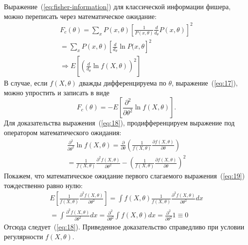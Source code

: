 Выражение~(\ref{eq:fisher-information}) для классической информации фишера, можно переписать через математическое ожидание: 
\begin{multline}
    \label{eq:17}
        F_c(\theta) =
            \sum_x P(x, \theta)\left[\frac{1}{P(x,\theta)}\frac{d}{d_\theta} P(x, \theta)\right]^2 \\
                = \sum_x P(x,\theta)\left[\frac{d}{d_\theta} 
                    \ln P(x,\theta \right]^2 \\ 
                    \Rightarrow E
                \left[\left(\frac{d}{d_\theta}\ln f(X,\theta)\right)^2
            \right]
\end{multline}
%
В случае, если $f(X,\theta)$ дважды дифференцируема по $\theta$, 
выражение~(\ref{eq:17}), можно упростить и записать в виде 
%
\begin{equation}\label{eq:18}
  F_c(\theta) = -E \left[\frac{\partial^2}{\partial \theta^2} \ln f(X,\theta)\right].
\end{equation}
%
Для доказательства выражения~(\ref{eq:18}), 
продифференцируем выражение под оператором математического ожидания: 
%
\begin{multline}
    \label{eq:19}
        \frac{\partial^2}{\partial \theta^2}\ln f(X,\theta) = 
            \frac{\partial}{\partial \theta}\left(\frac{1}{f(X,\theta)} 
                \frac{\partial f(X,\theta)}{\partial \theta} \right) \\
            = \frac{1}{f(X,\theta)}\frac{\partial^2 f(X,\theta)}{\partial \theta^2} -
        \left(\frac{1}{f(X,\theta)} \frac{\partial f(X,\theta)}{\partial \theta} 
    \right)^2
\end{multline}
%
Покажем, 
что математическое ожидание первого слагаемого выражения~(\ref{eq:19}) тождественно равно нулю:
%
\begin{multline}
    \label{eq:20}
        E\left[\frac{1}{f(X,\theta)} 
            \frac{\partial^2 f(X,\theta)}{\partial \theta^2}\right] = 
                \int f (X,\theta) \frac{1}{f(X,\theta)} 
                    \frac{\partial^2 f(X, \theta)}{\partial \theta^2}dx \\
                        = \int \frac{\partial^2 f(X,\theta)}{\partial \theta^2}dx =
                    \frac{\partial^2}{\partial \theta^2} \int f(X,\theta)dx 
                = \frac{\partial^2}{\partial \theta^2}1 \equiv 0
\end{multline}
%
Отсюда следует~(\ref{eq:18}). 
Приведенное доказательство справедливо при условии регулярности $f(X,\theta)$.


